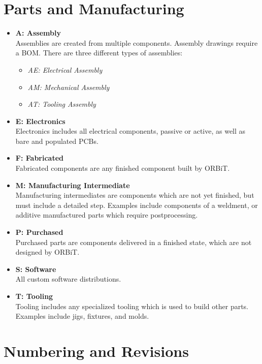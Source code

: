 \documentclass[12pt,article]{memoir}
\begin{document}
\newpage

\chapter{Parts and Manufacturing}
\begin{itemize}
\item \textbf{A: Assembly}\\
Assemblies are created from multiple components. Assembly drawings require a BOM. There are three different types of assemblies:
\begin{itemize}
	\item \textit{AE: Electrical Assembly}
	\item \textit{AM: Mechanical Assembly}
	\item \textit{AT: Tooling Assembly}
\end{itemize}
\item \textbf{E: Electronics}\\
Electronics includes all electrical components, passive or active, as well as bare and populated PCBs.
\item \textbf{F: Fabricated}\\
Fabricated components are any finished component built by ORBiT.
\item \textbf{M: Manufacturing Intermediate}\\
Manufacturing intermediates are components which are not yet finished, but must include a detailed step. Examples include components of a weldment, or additive manufactured parts which require postprocessing.
\item \textbf{P: Purchased}\\
Purchased parts are components delivered in a finished state, which are not designed by ORBiT.
\item \textbf{S: Software}\\
All custom software distributions.
\item \textbf{T: Tooling}\\
Tooling includes any specialized tooling which is used to build other parts. Examples include jigs, fixtures, and molds.
\end{itemize}

\newpage

\chapter{Numbering and Revisions}
\end{document}
